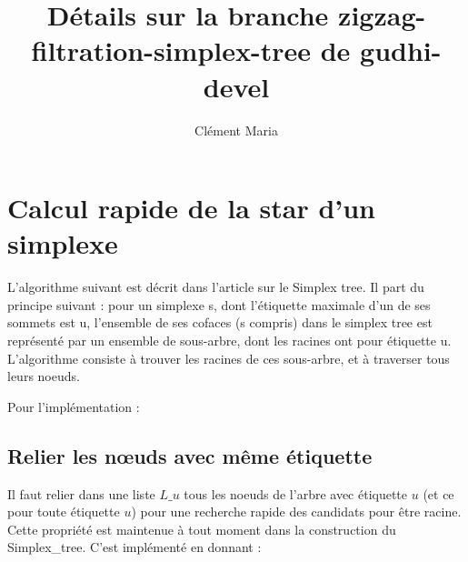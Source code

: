 \documentclass[11pt]{amsart}
\title{Détails sur la branche zigzag-filtration-simplex-tree de gudhi-devel}
\author{Cl\'ement Maria}
\numberwithin{equation}{section}
\theoremstyle{plain}
\theoremstyle{definition}
\begin{document}
\maketitle













\section{Calcul rapide de la star d'un simplexe}

L'algorithme suivant est décrit dans l'article sur le Simplex tree. Il part du principe suivant : pour un simplexe s, dont l'étiquette maximale d'un de ses sommets est u, l'ensemble de ses cofaces (s compris) dans le simplex tree est représenté par un ensemble de sous-arbre, dont les racines ont pour étiquette u. L'algorithme consiste à trouver les racines de ces sous-arbre, et à traverser tous leurs noeuds.

Pour l'implémentation :


\subsection{Relier les n\oe uds avec même étiquette}

Il faut relier dans une liste $L\_u$ tous les noeuds de l'arbre avec étiquette $u$ (et ce pour toute étiquette $u$) pour une recherche rapide des candidats pour être racine. Cette propriété est maintenue à tout moment dans la construction du Simplex\_tree. C'est implémenté en donnant :
\end{document}
